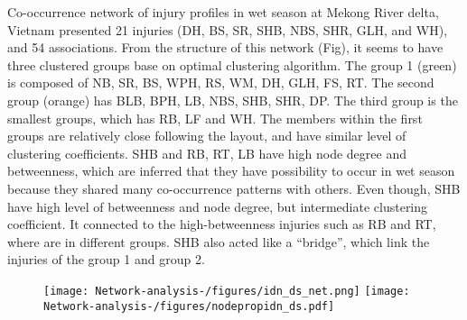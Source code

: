 Co-occurrence network of injury profiles in wet season at Mekong River delta, Vietnam presented 21 injuries (DH, BS, SR, SHB, NBS, SHR, GLH, and WH), and 54 associations. From the structure of this network (Fig), it seems to have three clustered groups base on optimal clustering algorithm. The group 1 (green) is composed of NB, SR, BS, WPH, RS, WM, DH, GLH, FS, RT. The second group (orange) has BLB, BPH, LB, NBS, SHB, SHR, DP. The third group is the smallest groups, which has RB, LF and WH. The members within the first groups are relatively close following the layout, and have similar level of clustering coefficients. SHB and RB, RT, LB have high node degree and betweenness, which are inferred that they have possibility to occur in wet season because they shared many co-occurrence patterns with others. Even though, SHB have high level of betweenness and node degree, but intermediate clustering coefficient.  It connected to the high-betweenness injuries such as RB and RT, where are in different groups. SHB also acted like a ``bridge'', which link the injuries of the group 1 and group 2.

%
%
\newpage
\begin{figure}
\centering
\texttt{[image: Network-analysis-/figures/idn\_ds\_net.png]}
\texttt{[image: Network-analysis-/figures/nodepropidn\_ds.pdf]}
\end{figure}
\newpage
